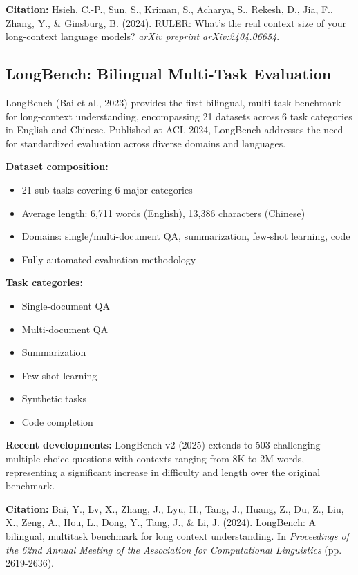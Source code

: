 \documentclass[11pt]{article}
\begin{document}
\textbf{Citation:} Hsieh, C.-P., Sun, S., Kriman, S., Acharya, S., Rekesh, D., Jia, F., Zhang, Y., \& Ginsburg, B. (2024). RULER: What's the real context size of your long-context language models? \textit{arXiv preprint arXiv:2404.06654}.

\subsection{LongBench: Bilingual Multi-Task Evaluation}

LongBench (Bai et al., 2023) provides the first bilingual, multi-task benchmark for long-context understanding, encompassing 21 datasets across 6 task categories in English and Chinese. Published at ACL 2024, LongBench addresses the need for standardized evaluation across diverse domains and languages.

\textbf{Dataset composition:}
\begin{itemize}[leftmargin=*]
    \item 21 sub-tasks covering 6 major categories
    \item Average length: 6,711 words (English), 13,386 characters (Chinese)
    \item Domains: single/multi-document QA, summarization, few-shot learning, code
    \item Fully automated evaluation methodology
\end{itemize}

\textbf{Task categories:}
\begin{itemize}[leftmargin=*]
    \item Single-document QA
    \item Multi-document QA
    \item Summarization
    \item Few-shot learning
    \item Synthetic tasks
    \item Code completion
\end{itemize}

\textbf{Recent developments:}
LongBench v2 (2025) extends to 503 challenging multiple-choice questions with contexts ranging from 8K to 2M words, representing a significant increase in difficulty and length over the original benchmark.

\textbf{Citation:} Bai, Y., Lv, X., Zhang, J., Lyu, H., Tang, J., Huang, Z., Du, Z., Liu, X., Zeng, A., Hou, L., Dong, Y., Tang, J., \& Li, J. (2024). LongBench: A bilingual, multitask benchmark for long context understanding. In \textit{Proceedings of the 62nd Annual Meeting of the Association for Computational Linguistics} (pp. 2619-2636).
\end{document}
